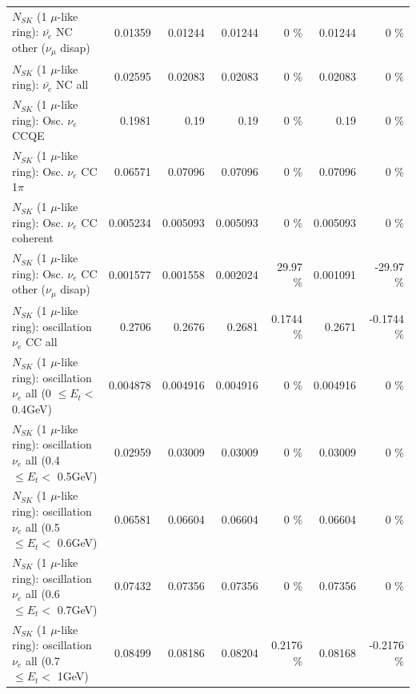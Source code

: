 \begin{table}
\begin{tabular}{| l | r | r | r  r | r  r |}
          $N_{SK}$ (1 $\mu$-like ring): $\bar{\nu_e}$ NC other ($\nu_\mu$ disap) &         0.01359 &         0.01244 &         0.01244 &        0 \%  &         0.01244 &        0 \%  \\ 
                            $N_{SK}$ (1 $\mu$-like ring): $\bar{\nu_{e}}$ NC all &         0.02595 &         0.02083 &         0.02083 &        0 \%  &         0.02083 &        0 \%  \\ 
\hline
\hline
\hline
                                 $N_{SK}$ (1 $\mu$-like ring): Osc. $\nu_e$ CCQE &          0.1981 &            0.19 &            0.19 &        0 \%  &            0.19 &        0 \%  \\ 
                            $N_{SK}$ (1 $\mu$-like ring): Osc. $\nu_e$ CC 1$\pi$ &         0.06571 &         0.07096 &         0.07096 &        0 \%  &         0.07096 &        0 \%  \\ 
                          $N_{SK}$ (1 $\mu$-like ring): Osc. $\nu_e$ CC coherent &        0.005234 &        0.005093 &        0.005093 &        0 \%  &        0.005093 &        0 \%  \\ 
           $N_{SK}$ (1 $\mu$-like ring): Osc. $\nu_e$ CC other ($\nu_\mu$ disap) &        0.001577 &        0.001558 &        0.002024 &    29.97 \%  &        0.001091 &   -29.97 \%  \\ 
                        $N_{SK}$ (1 $\mu$-like ring): oscillation $\nu_e$ CC all &          0.2706 &          0.2676 &          0.2681 &   0.1744 \%  &          0.2671 &  -0.1744 \%  \\ 
\hline
$N_{SK}$ (1 $\mu$-like ring): oscillation $\nu_{e}$ all (0 $\leq E_{t} <$ 0.4GeV) &        0.004878 &        0.004916 &        0.004916 &        0 \%  &        0.004916 &        0 \%  \\ 
$N_{SK}$ (1 $\mu$-like ring): oscillation $\nu_{e}$ all (0.4 $\leq E_{t} <$ 0.5GeV) &         0.02959 &         0.03009 &         0.03009 &        0 \%  &         0.03009 &        0 \%  \\ 
$N_{SK}$ (1 $\mu$-like ring): oscillation $\nu_{e}$ all (0.5 $\leq E_{t} <$ 0.6GeV) &         0.06581 &         0.06604 &         0.06604 &        0 \%  &         0.06604 &        0 \%  \\ 
$N_{SK}$ (1 $\mu$-like ring): oscillation $\nu_{e}$ all (0.6 $\leq E_{t} <$ 0.7GeV) &         0.07432 &         0.07356 &         0.07356 &        0 \%  &         0.07356 &        0 \%  \\ 
$N_{SK}$ (1 $\mu$-like ring): oscillation $\nu_{e}$ all (0.7 $\leq E_{t} <$ 1GeV) &         0.08499 &         0.08186 &         0.08204 &   0.2176 \%  &         0.08168 &  -0.2176 \%  \\ 

\end{tabular}
\end{table}
